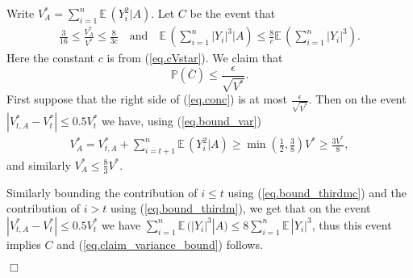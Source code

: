 \documentclass{article}
\newenvironment{proofof}[1]{\noindent {\bf Proof of #1}}{\hspace*{\fill}$\Box$}
\def\E{{\mathbb E}\,}
\newcommand{\pr}{\mathbb P}
\begin{document}
\begin{proofof}{Lemma~\ref{lem.clt}}
    Write $V_{A}^* = \sum_{i=1}^n \E (Y_i^2 | A)$.
    Let $C$ be the event that 
    \begin{align}\label{eq.defC}
        \frac 3 {16} \le \frac {V_{A}^*} {V^*} \le \frac {8} {3 c} \quad\mbox{and}\quad
    \E (\sum_{i=1}^n |Y_i|^3 | A) \le \frac 8 c \E (\sum_{i=1}^n |Y_i|^3).
    \end{align}
    Here the constant $c$ is from (\ref{eq.cVstar}).
    We claim that
    \begin{equation}\label{eq.claim_variance_bound}
        \pr(\bar{C}) \le \frac {\epsilon} {\sqrt{V^*}}.
    \end{equation}
    First suppose that the right side of (\ref{eq.conc}) is at most $\frac {\epsilon} {\sqrt{V^*}}$.
    Then on the event $|V_{t,A}^* - V_{t}^*|  \le 0.5 V_{t}^*$ we have, using (\ref{eq.bound_var})
    \begin{align*}
        V_{A}^*  = V_{t,A}^* + \sum_{i=t+1}^n \E (Y_i^2 | A) \ge \min(\frac 1 2, \frac 3 8) V^* \ge \frac {3 V^*} 8,
    \end{align*}
    and similarly $V_{A}^* \le \frac 8 3 V^*$.

    Similarly bounding the contribution of $i \le t$ using (\ref{eq.bound_thirdmc}) and the contribution of $i > t$ using (\ref{eq.bound_thirdm}), we get that on the event $|V_{t,A}^* - V_{t}^*|  \le 0.5 V_{t}^*$ we have  $\sum_{i=1}^n \E (|Y_i|^3 |A) \le 8 \sum_{i=1}^n \E |Y_i|^3 $, thus this event implies $C$ and (\ref{eq.claim_variance_bound}) follows.


\end{proofof}
\end{document}
